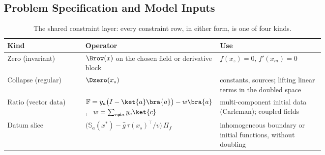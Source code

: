 
\subsection{Problem Specification and Model Inputs}
\label{sec:pipeline-inputs}

\begin{table}[htbp]
    \centering
    \caption{The shared constraint layer: every constraint row, in either form, is one of four kinds.}
    \label{tab:constraint-kinds}
    \small
    \begin{tabular}{@{}l p{0.42\linewidth} p{0.33\linewidth}@{}}
        \toprule
        Kind & Operator & Use \\
        \midrule
        Zero (invariant) & $\Brow(x)$ on the chosen field or derivative block & $f(x_z)=0$, $f'(x_m)=0$ \\
        Collapse (regular) & $\Dzero(x_s)$ & constants, sources; lifting linear terms in the doubled space \\
        Ratio (vector data) & $\mathbb{F} = y_a\bigl(I - \ket{a}\bra{a}\bigr) - w\bra{a}$, \ $w = \sum_{c\ne a} y_c\ket{c}$ & multi-component initial data (Carleman); coupled fields \\
        Datum slice & $\bigl(\mathbb{S}_a(x^\ast) - \hat g\,\tau(x_s)^{\top}/v\bigr)\,\Pi_f$ & inhomogeneous boundary or initial functions, without doubling \\
        \bottomrule
    \end{tabular}
\end{table}

